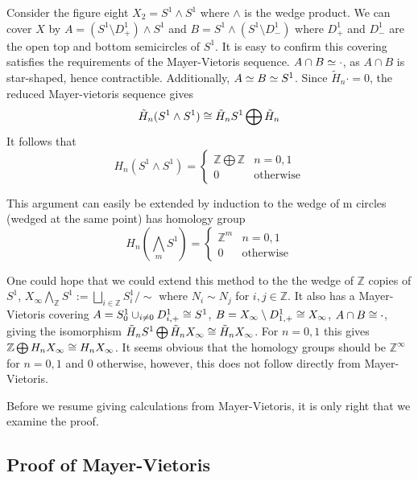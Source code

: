 \begin{example}
Consider the figure eight $X_2=S^1\wedge S^1$ where $\wedge$ is the wedge product. We can cover $X$ by $A=(S^1\setminus D^1_+)\wedge S^1$ and $B=S^1\wedge(S^1\setminus D^1_-)$ where $D^1_+$ and $D^1_-$ are the open top and bottom semicircles of $S^1$. It is easy to confirm this covering satisfies the requirements of the Mayer-Vietoris sequence. $A\cap B \simeq \cdot$, as $A\cap B$ is star-shaped, hence contractible. Additionally, $A\simeq B \simeq S^1$. Since $\tilde{H}_n \cdot=0$, the reduced Mayer-vietoris sequence gives
$$\tilde{H}_n (S^1\wedge S^1) \cong \tilde{H}_n S^1\bigoplus \tilde{H}_n$$
It follows that
$$H_n(S^1\wedge S^1)=
\begin{cases}
\mathbb{Z}\bigoplus \mathbb{Z} & n= 0,1\\
0 & \text{otherwise}
\end{cases}$$

This argument can easily be extended by induction to the wedge of m circles (wedged at the same point) has homology group 
$$H_n(\bigwedge_m S^1)=
\begin{cases}
\mathbb{Z}^m & n= 0,1\\
0 & \text{otherwise}
\end{cases}$$
\end{example}

\begin{remark}
One could hope that we could extend this method to the the wedge of $\mathbb{Z}$ copies of $S^1$, $X_{\infty}\bigwedge_{\mathbb{Z}} S^1:=\bigsqcup_{i\in \mathbb{Z}} S^1_i/\sim$ where $N_i \sim N_{j}$ for $i,j\in \mathbb{Z}$. It also has a Mayer-Vietoris covering $A=S^1_0\cup_{i\neq 0} D^1_{i,+}\cong S^1$, $B=X_{\infty}\setminus D^1_{1,+}\cong X_{\infty}$, $A\cap B \cong \cdot$, giving the isomorphism $\tilde{H}_n S^1 \bigoplus \tilde{H}_n X_{\infty} \cong \tilde{H}_n X_{\infty}$. For $n=0,1$ this gives $\mathbb{Z} \bigoplus H_n X_{\infty} \cong H_n X_{\infty}$. It seems obvious that the homology groups should be $\mathbb{Z}^{\infty}$ for $n=0,1$ and $0$ otherwise, however, this does not follow directly from Mayer-Vietoris.
\end{remark}

Before we resume giving calculations from Mayer-Vietoris, it is only right that we examine the proof.

\subsection{Proof of Mayer-Vietoris}


